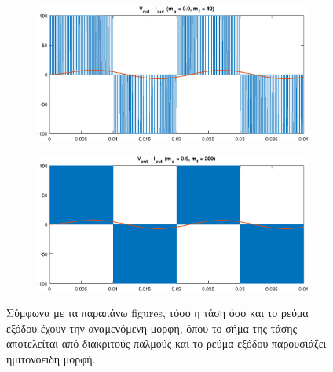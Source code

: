 \begin{figure}[h!]
	\begin{subfigure}{0.49\textwidth}
		\centering
		\includegraphics[width=1\textwidth]{Images/V_out_I_out_40}
	\end{subfigure}
	\begin{subfigure}{0.49\textwidth}
		\centering
		\includegraphics[width=1\textwidth]{Images/V_out_I_out_200}
	\end{subfigure}
	\noindent
	Σύμφωνα με τα παραπάνω figures, τόσο η τάση όσο και το ρεύμα εξόδου έχουν την αναμενόμενη μορφή, όπου το σήμα της τάσης αποτελείται από διακριτούς παλμούς και το ρεύμα εξόδου παρουσιάζει ημιτονοειδή μορφή.

\end{figure}

